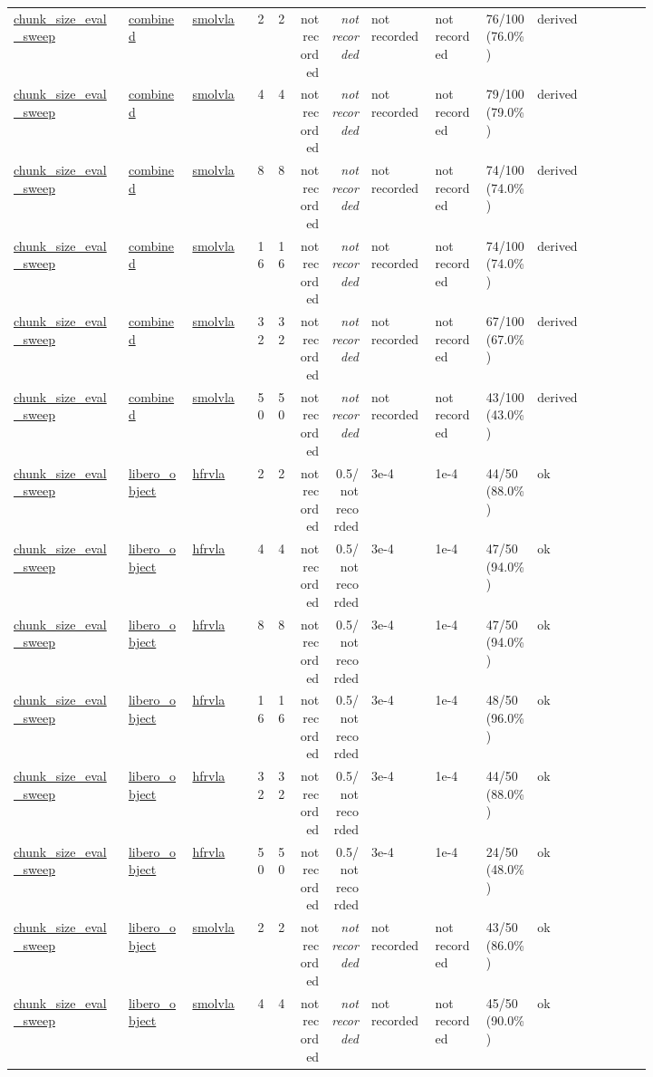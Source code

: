 \begin{tiny}
\begin{longtable}{@{}p{0.18\linewidth}p{0.10\linewidth}p{0.10\linewidth}rrrrp{0.10\linewidth}p{0.08\linewidth}p{0.08\linewidth}p{0.11\linewidth}p{0.07\linewidth}@{}}
\url{chunk_size_eval_sweep} & \url{combined} & \url{smolvla} & 2 & 2 & not recorded & \emph{not recorded} & not recorded & not recorded & 76/100 (76.0\%) & derived \\
\url{chunk_size_eval_sweep} & \url{combined} & \url{smolvla} & 4 & 4 & not recorded & \emph{not recorded} & not recorded & not recorded & 79/100 (79.0\%) & derived \\
\url{chunk_size_eval_sweep} & \url{combined} & \url{smolvla} & 8 & 8 & not recorded & \emph{not recorded} & not recorded & not recorded & 74/100 (74.0\%) & derived \\
\url{chunk_size_eval_sweep} & \url{combined} & \url{smolvla} & 16 & 16 & not recorded & \emph{not recorded} & not recorded & not recorded & 74/100 (74.0\%) & derived \\
\url{chunk_size_eval_sweep} & \url{combined} & \url{smolvla} & 32 & 32 & not recorded & \emph{not recorded} & not recorded & not recorded & 67/100 (67.0\%) & derived \\
\url{chunk_size_eval_sweep} & \url{combined} & \url{smolvla} & 50 & 50 & not recorded & \emph{not recorded} & not recorded & not recorded & 43/100 (43.0\%) & derived \\
\url{chunk_size_eval_sweep} & \url{libero_object} & \url{hfrvla} & 2 & 2 & not recorded & 0.5/not recorded & 3e-4 & 1e-4 & 44/50 (88.0\%) & ok \\
\url{chunk_size_eval_sweep} & \url{libero_object} & \url{hfrvla} & 4 & 4 & not recorded & 0.5/not recorded & 3e-4 & 1e-4 & 47/50 (94.0\%) & ok \\
\url{chunk_size_eval_sweep} & \url{libero_object} & \url{hfrvla} & 8 & 8 & not recorded & 0.5/not recorded & 3e-4 & 1e-4 & 47/50 (94.0\%) & ok \\
\url{chunk_size_eval_sweep} & \url{libero_object} & \url{hfrvla} & 16 & 16 & not recorded & 0.5/not recorded & 3e-4 & 1e-4 & 48/50 (96.0\%) & ok \\
\url{chunk_size_eval_sweep} & \url{libero_object} & \url{hfrvla} & 32 & 32 & not recorded & 0.5/not recorded & 3e-4 & 1e-4 & 44/50 (88.0\%) & ok \\
\url{chunk_size_eval_sweep} & \url{libero_object} & \url{hfrvla} & 50 & 50 & not recorded & 0.5/not recorded & 3e-4 & 1e-4 & 24/50 (48.0\%) & ok \\
\url{chunk_size_eval_sweep} & \url{libero_object} & \url{smolvla} & 2 & 2 & not recorded & \emph{not recorded} & not recorded & not recorded & 43/50 (86.0\%) & ok \\
\url{chunk_size_eval_sweep} & \url{libero_object} & \url{smolvla} & 4 & 4 & not recorded & \emph{not recorded} & not recorded & not recorded & 45/50 (90.0\%) & ok \\

\end{longtable}
\end{tiny}
